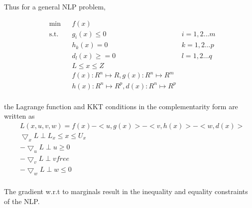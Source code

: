 \documentclass{article}
\begin{document}
Thus for a general NLP problem,

\begin{equation}
\begin{aligned}
&	\min
& & f(x) \\
& \text{s.t.} & & 	 g_{i}(x) \leqslant 0	&	i = 1,2...m \\
& & &			h_{k}(x) = 0	 &	k = 1,2...p \\
& & &			d_{l}(x) \geqslant =0		&	l = 1,2...q \\
& & &			L \leq x \leq Z \\
& & &			f(x): {\!R}^n \mapsto \!R , g(x): {\!R}^n \mapsto {\!R}^m\\
& & &			h(x): {\!R}^n \mapsto {\!R}^ p , d(x): {\!R}^n \mapsto {\!R}^ p\\
\end{aligned}
\end{equation}

\noindent the Lagrange function and KKT conditions in the complementarity form are written as \\ 

\begin{equation}
\begin{aligned}
& L(x,u,v,w) = f(x) - <u,g(x)> - <v,h(x)> - <w,d(x)>  \\
& \bigtriangledown_x L  \perp L_x \leq x \leq U_x 	\\
& - \bigtriangledown_u L  \perp u \geq 0	\\
& -\bigtriangledown_v L  \perp v free	\\	
& -\bigtriangledown_w L  \perp w \leq 0	\\
\end{aligned}
\end{equation}

The gradient w.r.t to marginals result in the inequality and equality constraints of the NLP.
\end{document}
